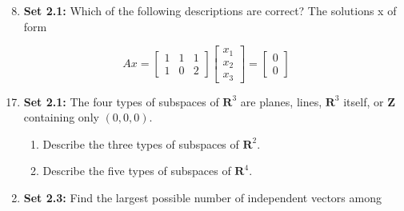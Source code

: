 \documentclass[a4paper,10pt]{article}
\begin{document}
\begin{enumerate}
 \setcounter{enumi}{7}
 \item \textbf{Set 2.1:} Which of the following descriptions are correct? The solutions x of form
\end{enumerate}

\begin{equation*}
 Ax = 
 \begin{bmatrix}
  1 & 1 & 1 \\
  1 & 0 & 2 
 \end{bmatrix} 
 \begin{bmatrix}
  x_1\\x_2\\x_3
 \end{bmatrix} = 
 \begin{bmatrix}
  0\\0
 \end{bmatrix}
\end{equation*}


\begin{enumerate}
\setcounter{enumi}{16}
 \item \textbf{Set 2.1:} The four types of subspaces of $\textbf{R}^3$ are planes, lines, $\textbf{R}^3$ itself, or $\textbf{Z}$ containing only $(0,0,0)$.
 \begin{enumerate}
  \item Describe the three types of subspaces of $\textbf{R}^2$.
  \item Describe the five types of subspaces of $\textbf{R}^4$.
 \end{enumerate}
\end{enumerate}

\begin{enumerate}
\setcounter{enumi}{1}
\item \textbf{Set 2.3:} Find the largest possible number of independent vectors among
\end{enumerate}
\end{document}
